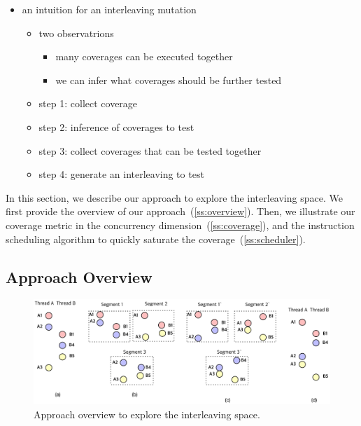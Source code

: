 {\begin{itemize}
\item an intuition for an interleaving mutation
  \begin{itemize}
  \item two observatrions
    \begin{itemize}
      \item many coverages can be executed together
      \item we can infer what coverages should be further tested
      \end{itemize}
  \item step 1: collect coverage
  \item step 2: inference of coverages to test
  \item step 3: collect coverages that can be tested together
  \item step 4: generate an interleaving to test
  \end{itemize}
\end{itemize}
}


In this section, we describe our approach to explore the interleaving
space.
%
We first provide the overview of our
approach~(\autoref{ss:overview}). Then, we illustrate our coverage
metric in the concurrency dimension~(\autoref{ss:coverage}), and the
instruction scheduling algorithm to quickly saturate the
coverage~(\autoref{ss:scheduler}).

\subsection{Approach Overview}
\label{ss:overview}

\begin{figure}[ht]
  \includegraphics[width=0.9\linewidth]{fig/intuition.pdf}
  \caption{Approach overview to explore the interleaving
    space. }
  \label{fig:overview}
\end{figure}

